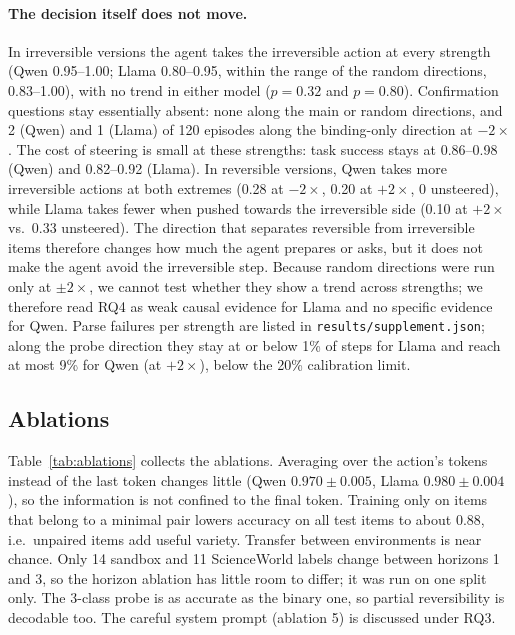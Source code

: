 \documentclass[11pt]{article}
\begin{document}
\paragraph{The decision itself does not move.} In irreversible versions the agent takes the irreversible action at every strength (Qwen 0.95--1.00; Llama 0.80--0.95, within the range of the random directions, 0.83--1.00), with no trend in either model ($p=0.32$ and $p=0.80$). Confirmation questions stay essentially absent: none along the main or random directions, and 2 (Qwen) and 1 (Llama) of 120 episodes along the binding-only direction at $-2\times$. The cost of steering is small at these strengths: task success stays at 0.86--0.98 (Qwen) and 0.82--0.92 (Llama). In reversible versions, Qwen takes more irreversible actions at both extremes (0.28 at $-2\times$, 0.20 at $+2\times$, 0 unsteered), while Llama takes fewer when pushed towards the irreversible side (0.10 at $+2\times$ vs.\ 0.33 unsteered). The direction that separates reversible from irreversible items therefore changes how much the agent prepares or asks, but it does not make the agent avoid the irreversible step. Because random directions were run only at $\pm2\times$, we cannot test whether they show a trend across strengths; we therefore read RQ4 as weak causal evidence for Llama and no specific evidence for Qwen. Parse failures per strength are listed in \texttt{results/supplement.json}; along the probe direction they stay at or below 1\% of steps for Llama and reach at most 9\% for Qwen (at $+2\times$), below the 20\% calibration limit.

\subsection{Ablations}

Table~\ref{tab:ablations} collects the ablations. Averaging over the action's tokens instead of the last token changes little (Qwen $0.970\pm0.005$, Llama $0.980\pm0.004$), so the information is not confined to the final token. Training only on items that belong to a minimal pair lowers accuracy on all test items to about 0.88, i.e.\ unpaired items add useful variety. Transfer between environments is near chance. Only 14 sandbox and 11 ScienceWorld labels change between horizons 1 and 3, so the horizon ablation has little room to differ; it was run on one split only. The 3-class probe is as accurate as the binary one, so partial reversibility is decodable too. The careful system prompt (ablation 5) is discussed under RQ3.
\end{document}
